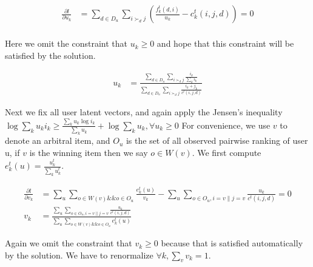 \documentclass{article}
\begin{document}

\begin{align}
\frac{\partial l}{\partial u_k}
& =  \sum_{d \in D_u} \sum_{i\succ_d j } (\frac{f_k^t(d,i)}{u_k }-c_k^t(i,j,d))  =0\\\nonumber
\end{align}

Here we omit the constraint that $u_k \geq 0$ and hope that this constraint will be satisfied by the solution. %

\begin{align}
u_k&= \frac{\sum_{d \in D_u} \sum_{i\succ_d j } \frac{i_k}{\sum_k i_k} }{ \sum_{d \in D_u} \sum_{i\succ_d j }  \frac{i_k+j_k}{c^t(i,j,d)}}
\end{align}

Next we fix all user latent vectors, and again apply the Jensen's inequality %
 $ \log \sum_k u_k i_k \geq \frac{\sum_k u_k \log i_k}{\sum_k u_k} + \log \sum_k u_k, \forall u_k\geq 0$
For convenience, we use $v$ to denote an arbitral item, and $O_u$ is the set of all observed pairwise ranking of user u, if $v$ is the winning item then we say $o\in W(v)$. We first compute $e_k^t(u)=\frac{u_k^t}{\sum_k u_k^t}$. 

\begin{align}
\frac{\partial l}{\partial v_k}
& =  \sum_u \sum_{o \in W(v) \&\& o\in O_u}  \frac{e_k^t(u)}{ v_k}- \sum_u \sum_{o \in O_u, i=v \| j=v } \frac{u_k}{c^t(i,j,d)} =0\\
v_k&= \frac{ \sum_u \sum_{o \in O_u, i=v\| j=v} \frac{u_k}{c^t(i,j,d)}}{\sum_u \sum_{o \in W(v) \&\& o\in O_u}  e_k^t(u)}
\end{align}

Again we omit the constraint that $v_k \geq 0$ because that is satisfied automatically by the solution. We have to renormalize $\forall k, \sum_v v_k=1$.
\end{document}
